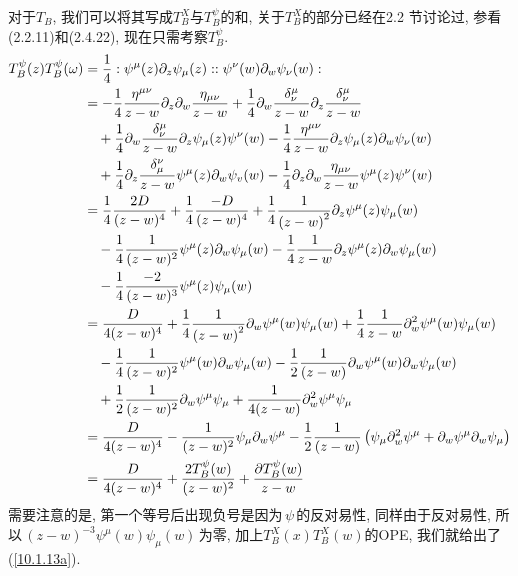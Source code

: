\begin{tcolorbox}
对于$T_{B}$, 我们可以将其写成$T_{B}^{X}$与$T_{B}^{\psi }$的和, 关于$T_{B}^{X}$的部分已经在2.2%
节讨论过, 参看(2.2.11)和(2.4.22),
现在只需考察$T_{B}^{\psi }$.%
\begin{align*}
T_{B}^{\psi }(z)T_{B}^{\psi }(\omega ) &=\frac{1}{4}:\psi ^{\mu
}(z)\partial _{z}\psi _{\mu }(z)::\psi ^{\nu }(w)\partial _{w}\psi _{\nu
}(w): \\
&=-\frac{1}{4}\frac{\eta ^{\mu \nu }}{z-w}\partial _{z}\partial _{w}\frac{%
\eta _{\mu \nu }}{z-w}+\frac{1}{4}\partial _{w}\frac{\delta _{\nu }^{\mu }}{%
z-w}\partial _{z}\frac{\delta _{\nu }^{\mu }}{z-w} \\
&\quad+\frac{1}{4}\partial _{w}\frac{\delta _{\nu }^{\mu }}{z-w}\partial
_{z}\psi _{\mu }(z)\psi ^{\nu }(w)-\frac{1}{4}\frac{\eta ^{\mu \nu }}{z-w}%
\partial _{z}\psi _{\mu }(z)\partial _{w}\psi _{\nu }(w) \\
&\quad+\frac{1}{4}\partial _{z}\frac{\delta _{\mu }^{\nu }}{z-w}\psi ^{\mu
}(z)\partial _{w}\psi _{v}(w)-\frac{1}{4}\partial _{z}\partial _{w}\frac{%
\eta _{\mu \nu }}{z-w}\psi ^{\mu }(z)\psi ^{\nu }(w) \\
&=\frac{1}{4}\frac{2D}{(z-w)^{4}}+\frac{1}{4}\frac{-D}{(z-w)^{4}}+\frac{1}{4%
}\frac{1}{\left( z-w\right) ^{2}}\partial _{z}\psi ^{\mu }(z)\psi _{\mu }(w)
\\
&\quad-\frac{1}{4}\frac{1}{(z-w)^{2}}\psi ^{\mu }(z)\partial _{w}\psi _{\mu }(w)-%
\frac{1}{4}\frac{1}{z-w}\partial _{z}\psi ^{\mu }(z)\partial _{w}\psi _{\mu
}(w) \\
&\quad-\frac{1}{4}\frac{-2}{(z-w)^{3}}\psi ^{\mu }(z)\psi _{\mu }(w) \\
&=\frac{D}{4(z-w)^{4}}+\frac{1}{4}\frac{1}{\left( z-w\right) ^{2}}\partial
_{w}\psi ^{\mu }(w)\psi _{\mu }(w)+\frac{1}{4}\frac{1}{z-w}\partial
_{w}^{2}\psi ^{\mu }(w)\psi _{\mu }(w) \\
&\quad-\frac{1}{4}\frac{1}{(z-w)^{2}}\psi ^{\mu }(w)\partial _{w}\psi _{\mu }(w)-%
\frac{1}{2}\frac{1}{(z-w)}\partial _{w}\psi ^{\mu }(w)\partial _{w}\psi
_{\mu }(w) \\
&\quad+\frac{1}{2}\frac{1}{(z-w)^{2}}\partial _{w}\psi ^{\mu }\psi _{\mu
} +\frac{1}{4(z-w)}\partial _{w}^{2}\psi ^{\mu }\psi _{\mu } \\
&=\frac{D}{4(z-w)^{4}}-\frac{1}{(z-w)^{2}}\psi _{\mu }\partial _{w}\psi
^{\mu }-\frac{1}{2}\frac{1}{(z-w)}\left( \psi _{\mu }\partial _{w}^{2}\psi
^{\mu }+\partial _{w}\psi ^{\mu }\partial _{w}\psi _{\mu }\right)  \\
&=\frac{D}{4(z-w)^{4}}+\frac{2T_{B}^{\psi }(w)}{(z-w)^{2}}+\frac{\partial
T_{B}^{\psi }(w)}{z-w}
\end{align*}
需要注意的是, 第一个等号后出现负号是因为$\,\psi\,$的反对易性, 同样由于反对易性, 所以$\,(z-w)^{-3}\psi^{\mu}(w)\psi_{\mu}(w)\,$为零, 加上$T_{B}^{X}(x)T_{B}^{X}(w)$的OPE, 我们就给出了(\ref{10.1.13a}).
\end{tcolorbox}


